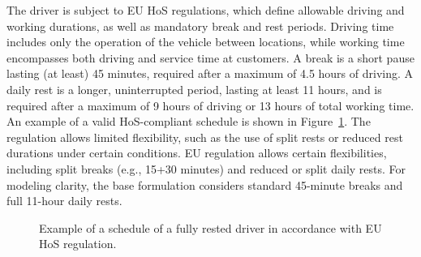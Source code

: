 \documentclass[3p,11pt,authoryear]{elsarticle}  %
\begin{document}
The driver is subject to EU HoS regulations, which define allowable driving and working durations, as well as mandatory break and rest periods. Driving time includes only the operation of the vehicle between locations, while working time encompasses both driving and service time at customers. A break is a short pause  lasting (at least) 45 minutes, required after a maximum of 4.5 hours of driving. A daily rest is a longer, uninterrupted period, lasting at least 11 hours, and is required after a maximum of 9 hours of driving or 13 hours of total working time. An example of a valid HoS-compliant schedule is shown in Figure~\ref{fig:driver_schedule}. The regulation allows limited flexibility, such as the use of split rests or reduced rest durations under certain conditions. EU regulation allows certain flexibilities, including split breaks (e.g., 15+30 minutes) and reduced or split daily rests. For modeling clarity, the base formulation considers standard 45-minute breaks and full 11-hour daily rests. %

\begin{figure}[htbp!]
\centering
{}
\caption{Example of a schedule of a fully rested driver in accordance with EU HoS regulation.}
\label{fig:driver_schedule}
\end{figure}
\end{document}
